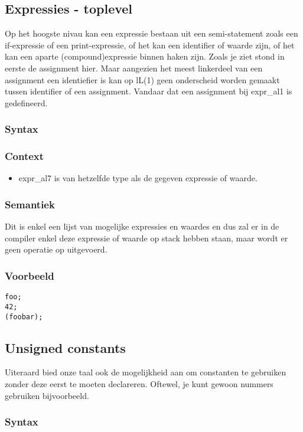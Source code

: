 \documentclass[]{article}
\begin{document}
\subsection{Expressies - toplevel}
Op het hoogste nivau kan een expressie bestaan uit een semi-statement zoals een if-expressie of een print-expressie, of het kan een identifier of waarde zijn, of het kan een aparte (compound)expressie binnen haken zijn.
Zoals je ziet stond in eerste de assignment hier. Maar aangezien het meest linkerdeel van een assignment een identiefier is kan op lL(1) geen onderscheid worden gemaakt tussen identifier of een assignment. Vandaar dat een assignment bij expr\_al1 is gedefineerd.
\subsubsection{Syntax}

\subsubsection{Context}
\begin{itemize}
\item expr\_al7 is van hetzelfde type als de gegeven expressie of waarde.
\end{itemize}
\subsubsection{Semantiek}
Dit is enkel een lijst van mogelijke expressies en waardes en dus zal er in de compiler enkel deze expressie of waarde op stack hebben staan, maar wordt er geen operatie op uitgevoerd.
\subsubsection{Voorbeeld}
\begin{lstlisting}[style=SELMA]
foo;
42;
(foobar);
\end{lstlisting}

\subsection{Unsigned constants}
Uiteraard bied onze taal ook de mogelijkheid aan om constanten te gebruiken zonder deze eerst te moeten declareren. Oftewel, je kunt gewoon nummers gebruiken bijvoorbeeld.
\subsubsection{Syntax}

\end{document}
